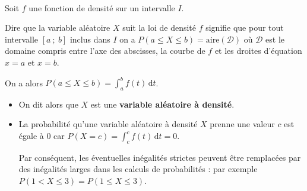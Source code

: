 \documentclass{cornouaille}
\begin{document}
\begin{definition}
~~

\begin{minipage}{0.65\linewidth}

Soit $f$ une fonction de densité sur un intervalle $I$.\medskip


Dire que la variable aléatoire $X$ suit la loi de densité $f$ signifie que pour tout intervalle $\left[a\ ;\ b \right]$ inclus dans $I$ on a ${P(a\leqslant X \leqslant b )=\textrm{aire}\left(\mathcal{D}\right)}$ où $\mathcal{D}$ est le domaine compris entre l'axe des abscisses, la courbe de $f$ et les droites d'équation $x=a$ et $x=b$.
\end{minipage}
\hfill
\begin{minipage}{0.3\linewidth}
\begin{center}
    \end{center}
\end{minipage}


On a alors $P(a \leqslant X \leqslant b)=\displaystyle \int_a^b f(t) \, \textrm{d}t$.
\end{definition}

\begin{remarques}
\begin{itemize}
\item On dit alors que $X$ est une \textbf{variable aléatoire à densité}.
\item La probabilité qu'une variable aléatoire à densité $X$ prenne
  une valeur $c$ est égale à 0 car $P(X=c)=\displaystyle \int_c^c f(t) \, \textrm{d}t=0$.

Par conséquent, les éventuelles inégalités strictes peuvent être remplacées par des inégalités larges dans les calculs de probabilités : par exemple $P\left(1 < X \leqslant 3\right)=P\left(1 \leqslant X \leqslant 3\right)$.

\end{itemize}
\end{remarques}
\end{document}
